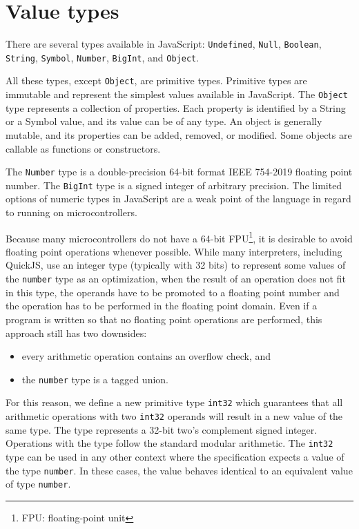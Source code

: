 \section{Value types}\label{lang:types}

There are several types available in JavaScript: \texttt{Undefined}, \texttt{Null}, \texttt{Boolean}, \texttt{String}, \texttt{Symbol}, \texttt{Number}, \texttt{BigInt}, and \texttt{Object}.

All these types, except \texttt{Object}, are primitive types. Primitive types are immutable and represent the simplest values available in JavaScript. The \texttt{Object} type represents a collection of properties. Each property is identified by a String or a Symbol value, and its value can be of any type. An object is generally mutable, and its properties can be added, removed, or modified. Some objects are callable as functions or constructors.

The \texttt{Number} type is a double-precision 64-bit format IEEE 754-2019\cite{ieee754} floating point number. The \texttt{BigInt} type is a signed integer of arbitrary precision. The limited options of numeric types in JavaScript are a weak point of the language in regard to running on microcontrollers.

Because many microcontrollers do not have a 64-bit FPU\footnote{FPU: floating-point unit}, it is desirable to avoid floating point operations whenever possible. While many interpreters, including QuickJS, use an integer type (typically with 32 bits) to represent some values of the \texttt{number} type as an optimization, when the result of an operation does not fit in this type, the operands have to be promoted to a floating point number and the operation has to be performed in the floating point domain. Even if a program is written so that no floating point operations are performed, this approach still has two downsides:
\begin{itemize}
    \item every arithmetic operation contains an overflow check, and
    \item the \texttt{number} type is a tagged union.
\end{itemize}

For this reason, we define a new primitive type \texttt{int32} which guarantees that all arithmetic operations with two \texttt{int32} operands will result in a new value of the same type. The type represents a 32-bit two's complement signed integer. Operations with the type follow the standard modular arithmetic. The \texttt{int32} type can be used in any other context where the specification expects a value of the type \texttt{number}. In these cases, the value behaves identical to an equivalent value of type \texttt{number}.

